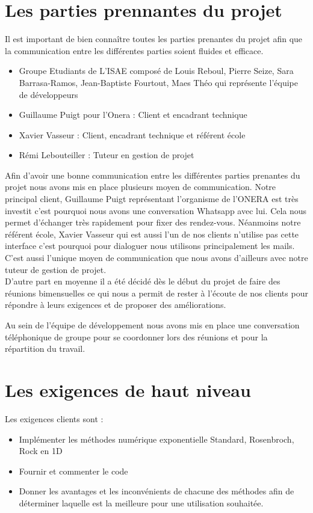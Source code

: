 \documentclass[a4paper,12pt]{report}
\theoremstyle{break}
\begin{document}
\section{Les parties prennantes du projet}	
   Il est important de bien connaître toutes les parties prenantes du projet afin que la communication entre les différentes parties soient fluides et efficace. 
   \begin{itemize}[label=\textbullet]
   	\item Groupe Etudiants de L’ISAE composé de Louis Reboul, Pierre Seize, Sara Barrasa-Ramos, Jean-Baptiste Fourtout, Maes Théo qui représente l’équipe de développeurs
   	\item Guillaume  Puigt pour l'Onera : Client et encadrant technique
   	\item Xavier Vasseur : Client, encadrant technique et référent école
   	\item Rémi Lebouteiller : Tuteur en gestion de projet
    \end{itemize}
\vspace{2mm}     
Afin d'avoir une bonne communication entre les différentes parties prenantes du projet nous avons mis en place plusieurs moyen de communication. Notre principal client, Guillaume Puigt représentant l'organisme de l'ONERA est très investit c'est pourquoi nous avons une conversation Whatsapp avec lui. Cela nous permet d'échanger très rapidement pour fixer des rendez-vous. Néanmoins notre référent école, Xavier Vasseur qui est aussi l’un de nos clients n’utilise pas cette interface c’est pourquoi pour dialoguer nous utilisons principalement les mails. C’est aussi l’unique moyen de communication que nous avons d’ailleurs avec notre tuteur de gestion de projet. \\

D’autre part en moyenne il a été décidé dès le début du projet de faire des réunions bimensuelles ce qui nous a permit de rester à l'écoute de nos clients pour répondre à leurs exigences et de proposer des améliorations.

Au sein de l'équipe de développement nous avons mis en place une conversation téléphonique de groupe pour se coordonner lors des réunions et pour la répartition du travail.


\section{Les exigences de haut niveau}
    Les exigences clients sont :
   \begin{itemize}[label=\textbullet]
   	\item Implémenter les méthodes numérique exponentielle Standard, Rosenbroch, Rock en 1D
   	\item Fournir et commenter le code
   	\item Donner les avantages et les inconvénients de chacune des méthodes afin de déterminer laquelle est la meilleure pour une utilisation souhaitée.
    \end{itemize}
\vspace{2mm}
\end{document}
